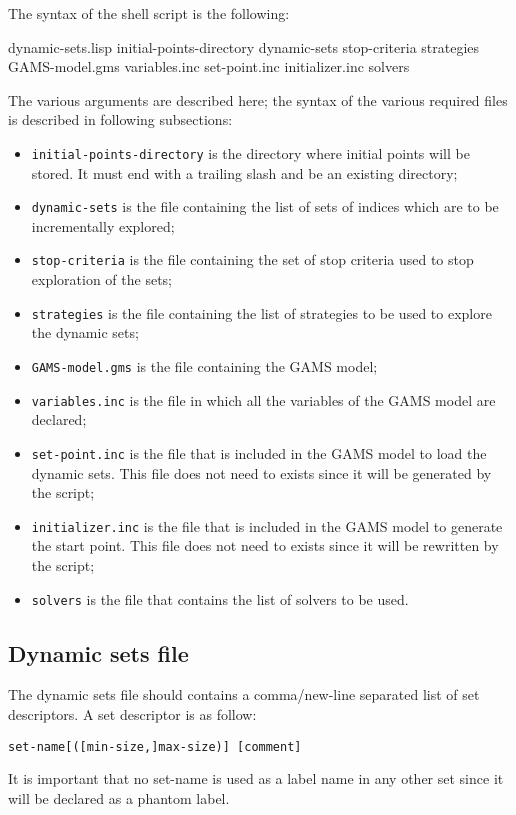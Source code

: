 \documentclass{article}
\begin{document}
The syntax of the shell script is the following:\\
\begin{tt}
  dynamic-sets.lisp initial-points-directory dynamic-sets stop-criteria
  strategies GAMS-model.gms variables.inc set-point.inc initializer.inc solvers
\end{tt}

The various arguments are described here; the syntax of the various required
files is described in following subsections:
\begin{itemize}
\item \texttt{initial-points-directory} is the directory where initial points
  will be stored. It must end with a trailing slash and be an existing
  directory;
\item \texttt{dynamic-sets} is the file containing the list of sets of indices
  which are to be incrementally explored;
\item \texttt{stop-criteria} is the file containing the set of stop criteria
  used to stop exploration of the sets;
\item \texttt{strategies} is the file containing the list of strategies to be
  used to explore the dynamic sets;
\item \texttt{GAMS-model.gms} is the file containing the GAMS model;
\item \texttt{variables.inc} is the file in which all the variables of the GAMS
  model are declared;
\item \texttt{set-point.inc} is the file that is included in the GAMS model to
  load the dynamic sets. This file does not need to exists since it will be
  generated by the script;
\item \texttt{initializer.inc} is the file that is included in the GAMS model to
  generate the start point. This file does not need to exists since it will be
  rewritten by the script;
\item \texttt{solvers} is the file that contains the list of solvers to be used.
\end{itemize}

\subsection*{Dynamic sets file}

The dynamic sets file should contains a comma/new-line separated list of set descriptors.
A set descriptor is as follow:
\begin{center}
  \texttt{set-name[([min-size,]max-size)] [comment]}
\end{center}
It is important that no set-name is used as a label name in any other set since
it will be declared as a phantom label.
\end{document}
